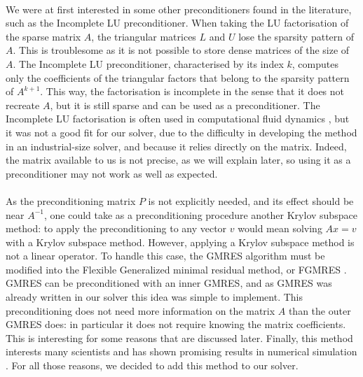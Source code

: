       \paragraph{}
      We were at first interested in some other preconditioners found in the literature, such as the Incomplete LU preconditioner.
      When taking the LU factorisation of the sparse matrix $A$, the triangular matrices $L$ and $U$ lose the sparsity pattern of $A$.
      This is troublesome as it is not possible to store dense matrices of the size of $A$.
      The Incomplete LU preconditioner, characterised by its index $k$, computes only the coefficients of the triangular factors that belong to the sparsity pattern of $A^{k+1}$.
      This way, the factorisation is incomplete in the sense that it does not recreate $A$, but it is still sparse and can be used as a preconditioner.
      The Incomplete LU factorisation is often used in computational fluid dynamics \cite{LiuZhangZhongEtAl2015, AhrabiMavriplis2020}, but it was not a good fit for our solver, due to the difficulty in developing the method in an industrial-size solver, and because it relies directly on the matrix.
      Indeed, the matrix available to us is not precise, as we will explain later, so using it as a preconditioner may not work as well as expected.

      \paragraph{}
      As the preconditioning matrix $P$ is not explicitly needed, and its effect should be near $A^{-1}$, one could take as a preconditioning procedure another Krylov subspace method: to apply the preconditioning to any vector $v$ would mean solving $Ax = v$ with a Krylov subspace method.
      However, applying a Krylov subspace method is not a linear operator.
      To handle this case, the GMRES algorithm must be modified into the Flexible Generalized minimal residual method, or FGMRES \cite{Saad1993, SimonciniSzyld2002}.
      GMRES can be preconditioned with an inner GMRES, and as GMRES was already written in our solver this idea was simple to implement.
      This preconditioning does not need more information on the matrix $A$ than the outer GMRES does: in particular it does not require knowing the matrix coefficients.
      This is interesting for some reasons that are discussed later.
      Finally, this method interests many scientists \cite{CoulaudGiraudRametEtAl2013, Vasseur2016} and has shown promising results in numerical simulation \cite{Pinel2010}.
      For all those reasons, we decided to add this method to our solver.

